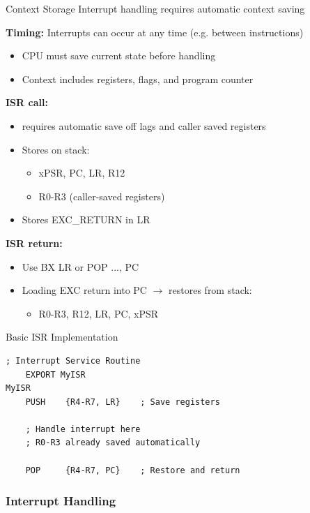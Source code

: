 \begin{definition}{Context Storage}
Interrupt handling requires automatic context saving

\textbf{Timing:} Interrupts can occur at any time (e.g. between instructions)
\begin{itemize}
  \item CPU must save current state before handling
  \item Context includes registers, flags, and program counter
\end{itemize}

\textbf{ISR call:}
\begin{itemize}
  \item requires automatic save off lags and caller saved registers
  \item Stores on stack:
    \begin{itemize}
      \item xPSR, PC, LR, R12
      \item R0-R3 (caller-saved registers)
    \end{itemize}
  \item Stores EXC\_RETURN in LR
\end{itemize}

\textbf{ISR return:}
\begin{itemize}
  \item Use BX LR or POP {..., PC}
  \item Loading EXC return into PC $\rightarrow$ restores from stack:
    \begin{itemize}
      \item R0-R3, R12, LR, PC, xPSR
    \end{itemize}
\end{itemize}
\end{definition}

\begin{example2}{Basic ISR Implementation}
\begin{lstlisting}[language=armasm, style=basesmol]
    ; Interrupt Service Routine
    EXPORT MyISR
MyISR
    PUSH    {R4-R7, LR}    ; Save registers
    
    ; Handle interrupt here
    ; R0-R3 already saved automatically
    
    POP     {R4-R7, PC}    ; Restore and return
\end{lstlisting}
\end{example2}

\subsubsection{Interrupt Handling}

